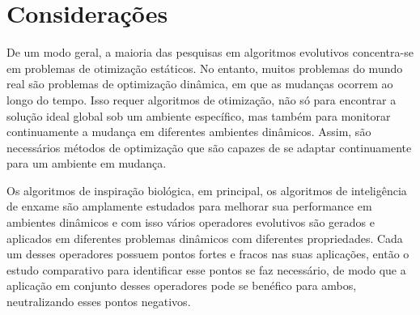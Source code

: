 \chapter{Considerações}
\label{ch:consideracoes}

De um modo geral, a maioria das pesquisas em algoritmos evolutivos concentra-se em problemas de otimização estáticos. No entanto, muitos problemas do mundo real são problemas de optimização dinâmica, em que as mudanças ocorrem ao longo do tempo. Isso requer algoritmos de otimização, não só para encontrar a solução ideal global sob um ambiente específico, mas também para monitorar continuamente a mudança em diferentes ambientes dinâmicos. Assim, são necessários métodos de optimização que são capazes de se adaptar continuamente para um ambiente em mudança.

Os algoritmos de inspiração biológica, em principal, os algoritmos de inteligência de enxame são amplamente estudados para melhorar sua performance em ambientes dinâmicos e com isso vários operadores evolutivos são gerados e aplicados em diferentes problemas dinâmicos com diferentes propriedades. Cada um desses operadores possuem pontos fortes e fracos nas suas aplicações, então o estudo comparativo para identificar esse pontos se faz necessário, de modo que a aplicação em conjunto desses operadores pode se benéfico para ambos, neutralizando esses pontos negativos.


